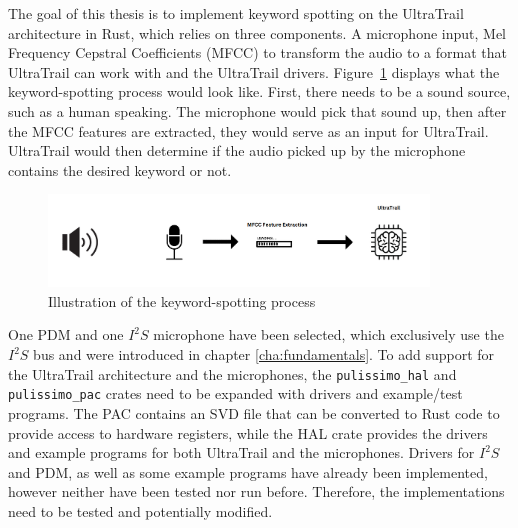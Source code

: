 
The goal of this thesis is to implement keyword spotting on the UltraTrail architecture in Rust,
which relies on three components.
A microphone input, Mel Frequency Cepstral Coefficients (MFCC) \cite[Cha 2.5]{rust_pulp} to transform the audio to
a format that UltraTrail can work with and the UltraTrail drivers.
Figure~\ref{fig:pipeline} displays what the keyword-spotting process would look like.
First, there needs to be a sound source, such as a human speaking.
The microphone would pick that sound up, then after the MFCC features are extracted, they would serve
as an input for UltraTrail. UltraTrail would then determine if the audio picked up by the microphone
contains the desired keyword or not.

\begin{figure}[H]
    \centering
    \includegraphics[width=0.9\textwidth]{figures/pipeline.png}
    \caption[Illustration of the keyword-spotting process]{Illustration of the keyword-spotting process}
    \label{fig:pipeline}
\end{figure}

One PDM and one $I^2S$ microphone have been selected, which exclusively use the $I^2S$ bus and were introduced
in chapter \ref{cha:fundamentals}.
To add support for the UltraTrail architecture and the microphones, the \lstinline{pulissimo_hal}
and \lstinline{pulissimo_pac} crates need to be expanded with drivers and example/test programs.
The PAC contains an SVD file that can be converted to Rust code to provide access to hardware registers,
while the HAL crate provides the drivers and example programs for both UltraTrail and the microphones.
Drivers for $I^2S$ and PDM, as well as some example programs have already been implemented,
however neither have been tested nor run before.
Therefore, the implementations need to be tested and potentially modified.

